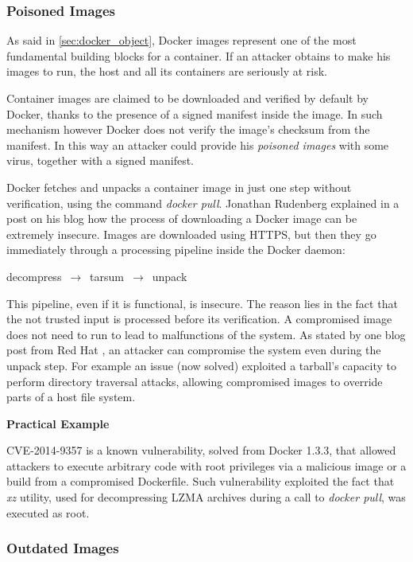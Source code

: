 \documentclass[a4paper,12pt]{article}
\begin{document}
\subsubsection{Poisoned Images}

As said in \ref{sec:docker_object}, Docker images represent one of the most
fundamental building blocks for a container. If an attacker obtains to make his
images to run, the host and all its containers are seriously at risk. \par
Container images are claimed to be downloaded and verified by default by Docker,
thanks to the presence of a signed manifest inside the image. In such mechanism
however Docker does not verify the image's checksum from the manifest. In this
way an attacker could provide his \textit{poisoned images} with some virus,
together with a signed manifest. \par Docker fetches and unpacks a container
image in just one step without verification, using the command \textit{docker
pull}. Jonathan Rudenberg explained in a post \cite{docker_image_insecurity} on
his blog how the process of downloading a Docker image can be extremely
insecure. Images are downloaded using HTTPS, but then they go immediately
through a processing pipeline inside the Docker daemon:
\bigbreak\centerline{decompress $\,\to\,$ tarsum $\,\to\,$ unpack}\bigbreak This
pipeline, even if it is functional, is insecure. The reason lies in the fact
that the not trusted input is processed before its verification. A compromised
image does not need to run to lead to malfunctions of the system. As stated by
one blog post from Red Hat \cite{docker_pull_red_hat}, an attacker can
compromise the system even during the unpack step. For example an issue (now
solved) exploited a tarball's capacity to perform directory traversal attacks,
allowing compromised images to override parts of a host file system.

\bigbreak\textbf{Practical Example}\bigbreak 

CVE-2014-9357 \cite{CVE-2014-9357} is a known vulnerability, solved from Docker
1.3.3, that allowed attackers to execute arbitrary code with root privileges via
a malicious image or a build from a compromised Dockerfile. Such vulnerability
exploited the fact that \textit{xz} utility, used for decompressing LZMA
archives during a call to \textit{docker pull}, was executed as root. 

\subsubsection{Outdated Images}
\end{document}
